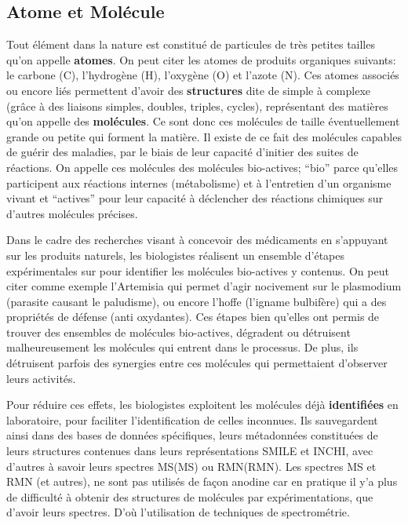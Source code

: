 \subsection{Atome et Molécule}
    Tout élément dans la nature est constitué de particules de très petites tailles qu'on appelle \textbf{atomes}.
    On peut citer les atomes de produits organiques suivants: le carbone (C), l'hydrogène (H), l'oxygène (O) et l'azote (N).
    Ces atomes associés ou encore liés permettent d'avoir des \textbf{structures} dite de simple à complexe (grâce à des liaisons simples, doubles, triples, cycles), représentant des matières qu'on appelle des \textbf{molécules}.
    Ce sont donc ces molécules de taille éventuellement grande ou petite qui forment la matière.
    Il existe de ce fait des molécules capables de guérir des maladies, par le biais de leur capacité d'initier des suites de réactions.
    On appelle ces molécules des molécules bio-actives; “bio” parce qu'elles participent aux réactions internes (métabolisme) et à l'entretien d'un organisme vivant et “actives” pour leur capacité à déclencher des réactions chimiques sur d'autres molécules précises.

    Dans le cadre des recherches visant à concevoir des médicaments en s’appuyant sur les produits naturels, les biologistes réalisent un ensemble d'étapes expérimentales \cite{nothias2018bioactivity} sur pour identifier les molécules bio-actives y contenus.
    On peut citer comme exemple l'Artemisia qui permet d'agir nocivement sur le plasmodium (parasite causant le paludisme), ou encore l'hoffe (l'igname bulbifère) qui a des propriétés de défense (anti oxydantes).
    Ces étapes bien qu'elles ont permis de trouver des ensembles de molécules bio-actives, dégradent ou détruisent malheureusement les molécules qui entrent dans le processus.
    De plus, ils détruisent parfois des synergies entre ces molécules qui permettaient d’observer leurs activités.
    
    Pour réduire ces effets, les biologistes exploitent les molécules déjà \textbf{identifiées} en laboratoire, pour faciliter l'identification de celles inconnues.
    Ils sauvegardent ainsi dans des bases de données spécifiques, leurs métadonnées constituées de leurs structures contenues dans leurs représentations \acrshort{SMILE} et \acrshort{INCHI}, avec d'autres à savoir leurs spectres MS(\acrlong{MS}) ou RMN(\acrlong{RMN}).
    Les spectres {MS} et {RMN} (et autres), ne sont pas utilisés de façon anodine car en pratique il y'a plus de difficulté à obtenir des structures de molécules par expérimentations, que d'avoir leurs spectres.
    D'où l'utilisation de techniques de spectrométrie.
    
